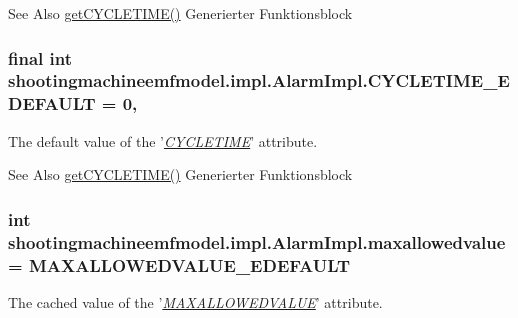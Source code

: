 \begin{DoxySeeAlso}{See Also}
\hyperlink{classshootingmachineemfmodel_1_1impl_1_1_alarm_impl_a5bf352e51eec89bd76092fb853ddde24}{get\-C\-Y\-C\-L\-E\-T\-I\-M\-E()} Generierter Funktionsblock  
\end{DoxySeeAlso}
\hypertarget{classshootingmachineemfmodel_1_1impl_1_1_alarm_impl_a8014dd85bb93f14eda34c8ba7fd6e572}{
\subsubsection[{C\-Y\-C\-L\-E\-T\-I\-M\-E\-\_\-\-E\-D\-E\-F\-A\-U\-L\-T}]{\setlength{\rightskip}{0pt plus 5cm}final int shootingmachineemfmodel.\-impl.\-Alarm\-Impl.\-C\-Y\-C\-L\-E\-T\-I\-M\-E\-\_\-\-E\-D\-E\-F\-A\-U\-L\-T = 0\hspace{0.3cm}{\ttfamily [static]}, {\ttfamily [protected]}}}\label{classshootingmachineemfmodel_1_1impl_1_1_alarm_impl_a8014dd85bb93f14eda34c8ba7fd6e572}
The default value of the '\hyperlink{classshootingmachineemfmodel_1_1impl_1_1_alarm_impl_a5bf352e51eec89bd76092fb853ddde24}{{\itshape C\-Y\-C\-L\-E\-T\-I\-M\-E}}' attribute.

\begin{DoxySeeAlso}{See Also}
\hyperlink{classshootingmachineemfmodel_1_1impl_1_1_alarm_impl_a5bf352e51eec89bd76092fb853ddde24}{get\-C\-Y\-C\-L\-E\-T\-I\-M\-E()} Generierter Funktionsblock  
\end{DoxySeeAlso}
\hypertarget{classshootingmachineemfmodel_1_1impl_1_1_alarm_impl_a63897cf99fd1eba61bc5fd9aa6d168ca}{
\subsubsection[{maxallowedvalue}]{\setlength{\rightskip}{0pt plus 5cm}int shootingmachineemfmodel.\-impl.\-Alarm\-Impl.\-maxallowedvalue = {\bf M\-A\-X\-A\-L\-L\-O\-W\-E\-D\-V\-A\-L\-U\-E\-\_\-\-E\-D\-E\-F\-A\-U\-L\-T}\hspace{0.3cm}{\ttfamily [protected]}}}\label{classshootingmachineemfmodel_1_1impl_1_1_alarm_impl_a63897cf99fd1eba61bc5fd9aa6d168ca}
The cached value of the '\hyperlink{classshootingmachineemfmodel_1_1impl_1_1_alarm_impl_a4b4fd8f246341c47e1469cb78ac1fd7b}{{\itshape M\-A\-X\-A\-L\-L\-O\-W\-E\-D\-V\-A\-L\-U\-E}}' attribute.

